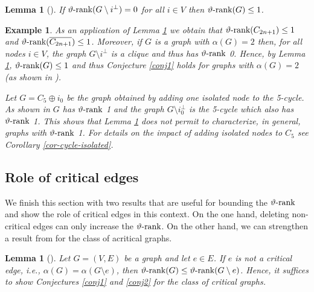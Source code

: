 \documentclass[11pt]{article}
\newtheorem{lemma}[theorem]{Lemma}
\newtheorem{example}[theorem]{Example}
\numberwithin{equation}{section}
\newcommand{\MK}{{\mathcal K}}
\newcommand{\rrank}{\vartheta\text{\rm -rank}}
\begin{document}
\begin{lemma}%
[\cite{dKP2002}]\label{G-i-2}
If $\rrank(G\setminus i^\perp)=0$ for all $i\in V$ then $\rrank (G)\le 1$.
\end{lemma}


\begin{example} \label{odd-cycles}
As an application of Lemma \ref{G-i-2} we obtain  that $\rrank(C_{2n+1})\leq1$ and $\rrank(\overline{C_{2n+1}})\leq1$. Moreover, if  $G$ is a graph with $\alpha(G)=2$ then, for all nodes $i\in V$,  the graph     $G\setminus {i^{\perp}}$ is a  clique and thus has $\rrank$ 0. Hence, by Lemma \ref{G-i-2},  $\rrank(G)\le 1$ and thus Conjecture \ref{conj1} holds for  graphs with $\alpha(G)=2$ (as shown in \cite{dKP2002}).

Let $G=C_5 \oplus i_0$ be the graph obtained by adding one isolated node to the 5-cycle. As shown in \cite{dKP2002} 
$G$  has $\rrank$ 1   and the graph $G\setminus i_0^{\perp}$ is the 5-cycle which also has $\rrank$ 1. This shows that Lemma \ref{G-i-2} does not permit to characterize, in general,  graphs with $\rrank$ 1. For details on  the impact of adding isolated nodes to $C_5$ see Corollary \ref{cor-cycle-isolated}.
\end{example}



\subsection{Role of critical edges}

We finish this section with two results that are useful for bounding the $\rrank$ and show the role of critical edges in this context. On the one hand, deleting non-critical edges can only increase the $\rrank$.  On the other hand, we can strengthen a result from \cite{GL2007} for the class of acritical graphs.
\begin{lemma}[\cite{LV2021}]\label{del_acritical}
Let $G=(V,E)$ be a graph and let $e \in E$. If $e$ is not a critical edge, i.e., $\alpha(G)=\alpha(G\setminus{e})$, then $\rrank(G)\leq \rrank(G\setminus{e})$. Hence, it suffices to show Conjectures \ref{conj1} and \ref{conj2} for the class of critical graphs.
\end{lemma}
\end{document}
